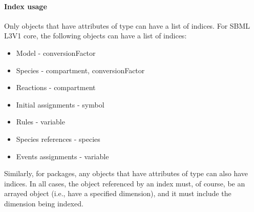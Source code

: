 \paragraph{Index usage}

Only objects that have attributes of  type can have a list of indices.  For SBML L3V1 core, the following objects can have a list of indices:
\begin{itemize}
\item Model - conversionFactor
\item Species - compartment, conversionFactor
\item Reactions - compartment
\item Initial assignments - symbol
\item Rules - variable
\item Species references - species
\item Events assignments - variable
\end{itemize}
Similarly, for packages, any objects that have attributes of  type can also have indices.
In all cases, the object referenced by an index must, of course, be an arrayed object (i.e., have a specified dimension), and it must include the dimension being indexed.

